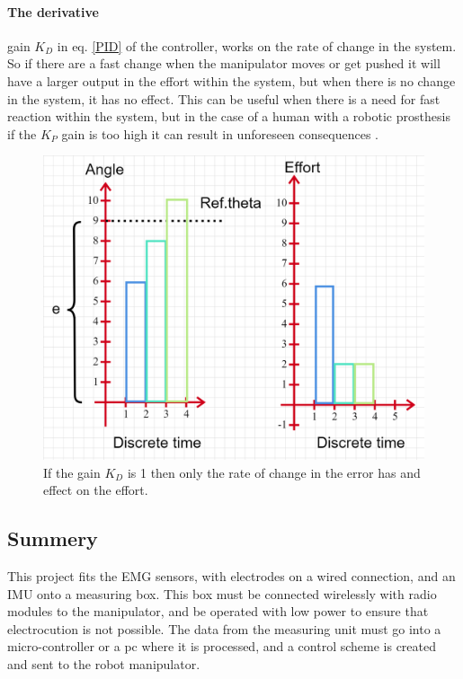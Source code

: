 \paragraph{The derivative} gain $K_D$ in eq. \ref{PID} of the controller, works on the rate of change in the system. So if there are a fast change when the manipulator moves or get pushed it will have a larger output in the effort within the system, but when there is no change in the system, it has no effect. This can be useful when there is a need for fast reaction within the system, but in the case of a human with a robotic prosthesis if the $K_P$ gain is too high it can result in unforeseen consequences .\\ 
\begin{figure}[H]
    \centering
    \includegraphics[width=\textwidth]{Figures/Technical_figures/DGAIN.png} 
    \caption{If the gain $K_D$ is 1 then only the rate of change in the error has and effect on the effort.}
    \label{fig:DGain}
\end{figure}


\subsection*{Summery}
This project fits the EMG sensors, with electrodes on a wired connection, and an IMU onto a measuring box. This box must be connected wirelessly with radio modules to the manipulator, and be operated with low power to ensure that electrocution is not possible. The data from the measuring unit must go into a micro-controller or a pc where it is processed, and a control scheme is created and sent to the robot manipulator. 


